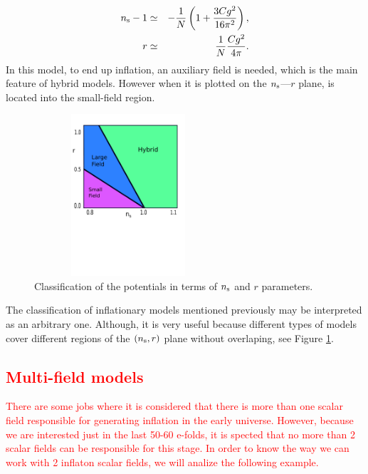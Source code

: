 \documentclass{rmaa}
\def\bea{\begin{eqnarray}}
\def\eea{\end{eqnarray}}
\begin{document}
\bea
n_{\rm s}-1&\simeq& -\frac{1}{N}\left(1+\frac{3C g^2}{16 \pi^2}\right), \nonumber \\
r&\simeq& \frac{1}{N}{Cg^2\over 4\pi}.
 \eea
%
In this model, to end up inflation, an auxiliary field is needed, which is the main feature of
hybrid models. However when it is plotted on the $n_{\rm s}$---$r$ plane, is located into the
small-field region.
\\

\begin{figure}[h!]
\begin{center}
  \includegraphics[trim = 0mm 100mm 0mm 10mm, clip, width=7cm, height=6cm]{Zoo.pdf}
	\caption{Classification of the
potentials in terms of $n_{\rm s}$ and $r$ parameters. }
\label{fig:parameters}
\end{center}
\end{figure}

The classification of inflationary models mentioned previously may be interpreted as an 
arbitrary one. Although, it is very useful because different types of models cover different 
regions of the $(n_{\rm s}, r)$ plane without overlaping, see Figure \ref{fig:parameters}.

\subsection{\textcolor{red}{Multi-field models}}

\textcolor{red}{There are some jobs where it is considered that there is more than one scalar field responsible for generating inflation in the early universe. However, because we are interested just in the last 50-60 e-folds, it is spected that no more than 2 scalar fields can be responsible for this stage. In order to know the way we can work with 2 inflaton scalar fields, we will analize the following example.}
\end{document}
